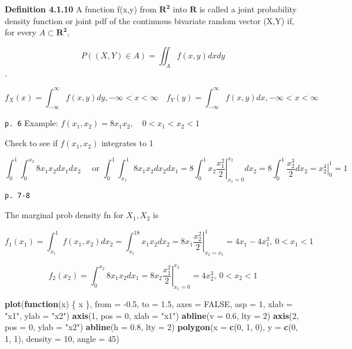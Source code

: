 \documentclass[]{tufte-book}
\newenvironment{Shaded}{}{}
\newcommand{\ControlFlowTok}[1]{\textcolor[rgb]{0.00,0.44,0.13}{\textbf{#1}}}
\newcommand{\DataTypeTok}[1]{\textcolor[rgb]{0.56,0.13,0.00}{#1}}
\newcommand{\DecValTok}[1]{\textcolor[rgb]{0.25,0.63,0.44}{#1}}
\newcommand{\FloatTok}[1]{\textcolor[rgb]{0.25,0.63,0.44}{#1}}
\newcommand{\KeywordTok}[1]{\textcolor[rgb]{0.00,0.44,0.13}{\textbf{#1}}}
\newcommand{\NormalTok}[1]{#1}
\newcommand{\OtherTok}[1]{\textcolor[rgb]{0.00,0.44,0.13}{#1}}
\newcommand{\StringTok}[1]{\textcolor[rgb]{0.25,0.44,0.63}{#1}}
\begin{document}
\textbf{Definition 4.1.10} A function f(x,y) from \(\mathbf{R^2}\) into
\(\mathbf{R}\) is called a joint probability density function or joint
pdf of the continuous bivariate random vector (X,Y) if, for every
\(A\subset\mathbf{R^2}\),

\[P((X,Y)\in A)=\iint_A f(x,y)dxdy\].

\[f_X(x)=\int_{-\infty}^{\infty}f(x,y)dy, -\infty<x<\infty\quad f_Y(y)=\int_{-\infty}^{\infty}f(x,y)dx, -\infty<x<\infty\]

\texttt{p.\ 6} Example: \(f(x_1,x_2)=8x_1x_2, \quad 0<x_1<x_2<1\)

Check to see if \(f(x_1,x_2)\) integrates to 1

\[\int_0^1\int_0^{x_2}8x_1x_2dx_1dx_2\quad \text{ or }\int_0^1\int_{x_1}^{1}8x_1x_2dx_2dx_1=8\int_0^1x_2\left.\frac{x_1^2}2\right|_{x_1=0}^{x_2}dx_2=8\int_0^1\frac{x_2^3}2dx_2=\left.x_2^4\right|_0^1=1\]

\texttt{p.\ 7-8}

The marginal prob density fn for \(X_1, X_2\) is

\[f_1(x_1)=\int_{x_1}^1f(x_1,x_2)dx_2=\int_{x_1}^18x_1x_2dx_2=8x_1\left.\frac{x_2^2}2\right|_{x_2=x_1}^{1}=4x_1-4x_1^3,\ 0<x_1<1\]

\[f_2(x_2)=\int_0^{x_2}8x_1x_2dx_1=8x_2\left.\frac{x_1^2}2\right|_{x_1=0}^{x_2}=4x_2^3,\ 0<x_2<1\]

\begin{Shaded}
\begin{Highlighting}[]
\KeywordTok{plot}\NormalTok{(}\ControlFlowTok{function}\NormalTok{(x) \{}
\NormalTok{    x}
\NormalTok{\}, }\DataTypeTok{from =} \FloatTok{-0.5}\NormalTok{, }\DataTypeTok{to =} \FloatTok{1.5}\NormalTok{, }\DataTypeTok{axes =} \OtherTok{FALSE}\NormalTok{, }\DataTypeTok{asp =} \DecValTok{1}\NormalTok{, }\DataTypeTok{xlab =} \StringTok{"x1"}\NormalTok{, }
    \DataTypeTok{ylab =} \StringTok{"x2"}\NormalTok{)}
\KeywordTok{axis}\NormalTok{(}\DecValTok{1}\NormalTok{, }\DataTypeTok{pos =} \DecValTok{0}\NormalTok{, }\DataTypeTok{xlab =} \StringTok{"x1"}\NormalTok{)}
\KeywordTok{abline}\NormalTok{(}\DataTypeTok{v =} \FloatTok{0.6}\NormalTok{, }\DataTypeTok{lty =} \DecValTok{2}\NormalTok{)}
\KeywordTok{axis}\NormalTok{(}\DecValTok{2}\NormalTok{, }\DataTypeTok{pos =} \DecValTok{0}\NormalTok{, }\DataTypeTok{ylab =} \StringTok{"x2"}\NormalTok{)}
\KeywordTok{abline}\NormalTok{(}\DataTypeTok{h =} \FloatTok{0.8}\NormalTok{, }\DataTypeTok{lty =} \DecValTok{2}\NormalTok{)}
\KeywordTok{polygon}\NormalTok{(}\DataTypeTok{x =} \KeywordTok{c}\NormalTok{(}\DecValTok{0}\NormalTok{, }\DecValTok{1}\NormalTok{, }\DecValTok{0}\NormalTok{), }\DataTypeTok{y =} \KeywordTok{c}\NormalTok{(}\DecValTok{0}\NormalTok{, }\DecValTok{1}\NormalTok{, }\DecValTok{1}\NormalTok{), }\DataTypeTok{density =} \DecValTok{10}\NormalTok{, }\DataTypeTok{angle =} \DecValTok{45}\NormalTok{)}
\end{Highlighting}
\end{Shaded}
\end{document}
